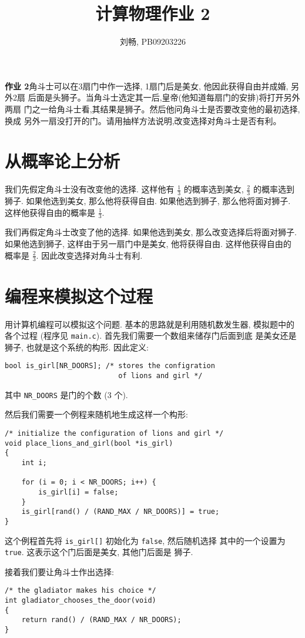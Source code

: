 \documentclass{ctexart}
\begin{document}
\title{计算物理作业 2}
\author{刘畅, PB09203226}
\maketitle

{\bf 作业 2}\quad 角斗士可以在3扇门中作一选择,
1扇门后是美女, 他因此获得自由并成婚, 另外2扇
后面是头狮子。当角斗士选定其一后,皇帝(他知道每扇门的安排)将打开另外两扇
门之一给角斗士看,其结果是狮子。然后他问角斗士是否要改变他的最初选择,换成
另外一扇没打开的门。请用抽样方法说明,改变选择对角斗士是否有利。

\section{从概率论上分析}
我们先假定角斗士没有改变他的选择. 这样他有 $\frac{1}{3}$ 的概率选到美女,
$\frac{2}{3}$ 的概率选到狮子. 如果他选到美女, 那么他将获得自由.
如果他选到狮子, 那么他将面对狮子. 这样他获得自由的概率是 $\frac{1}{3}$.

我们再假定角斗士改变了他的选择. 如果他选到美女, 那么改变选择后将面对狮子.
如果他选到狮子, 这样由于另一扇门中是美女, 他将获得自由. 这样他获得自由的
概率是 $\frac{2}{3}$. 因此改变选择对角斗士有利.

\section{编程来模拟这个过程}
用计算机编程可以模拟这个问题. 基本的思路就是利用随机数发生器, 模拟题中的
各个过程 (程序见 \verb|main.c|). 首先我们需要一个数组来储存门后面到底
是美女还是狮子, 也就是这个系统的构形. 因此定义:
\begin{verbatim}
bool is_girl[NR_DOORS];	/* stores the configration
                           of lions and girl */
\end{verbatim}
其中 \verb|NR_DOORS| 是门的个数 (3 个).

然后我们需要一个例程来随机地生成这样一个构形:
\begin{verbatim}
/* initialize the configuration of lions and girl */
void place_lions_and_girl(bool *is_girl)
{
    int i;

    for (i = 0; i < NR_DOORS; i++) {
        is_girl[i] = false;
    }
    is_girl[rand() / (RAND_MAX / NR_DOORS)] = true;
}
\end{verbatim}
这个例程首先将 \verb|is_girl[]| 初始化为 \verb|false|, 然后随机选择
其中的一个设置为 \verb|true|. 这表示这个门后面是美女, 其他门后面是
狮子.

接着我们要让角斗士作出选择:
\begin{verbatim}
/* the gladiator makes his choice */
int gladiator_chooses_the_door(void)
{
    return rand() / (RAND_MAX / NR_DOORS);
}
\end{verbatim}
\end{document}
